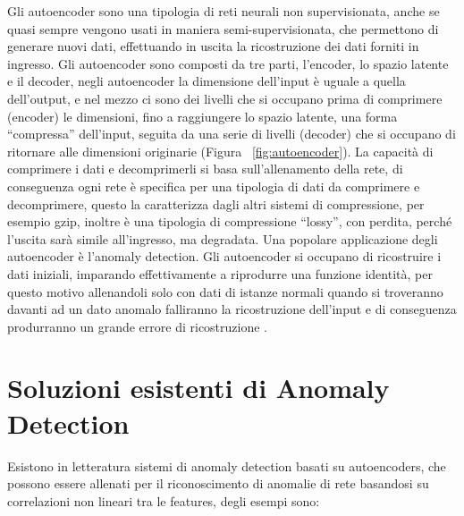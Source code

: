 

Gli autoencoder sono una tipologia di reti neurali non supervisionata, anche se quasi sempre vengono usati in maniera semi-supervisionata, che permettono di generare nuovi dati, effettuando in uscita la ricostruzione dei dati forniti in ingresso.
Gli autoencoder sono composti da tre parti, l'encoder, lo spazio latente e il decoder, negli autoencoder la dimensione dell'input è uguale a quella dell'output, e nel mezzo ci sono dei livelli che si occupano prima di comprimere (encoder) le dimensioni, fino a raggiungere lo spazio latente, una forma ``compressa'' dell'input, seguita da una serie di livelli (decoder) che si occupano di ritornare alle dimensioni originarie (Figura ~\ref{fig:autoencoder}).
La capacità di comprimere i dati e decomprimerli si basa sull'allenamento della rete, di conseguenza ogni rete è specifica per una tipologia di dati da comprimere e decomprimere, questo la caratterizza dagli altri sistemi di compressione, per esempio gzip, inoltre è una tipologia di compressione ``lossy'', con perdita, perché l'uscita sarà simile all'ingresso, ma degradata.
Una popolare applicazione degli autoencoder è l'anomaly detection. Gli autoencoder si occupano di ricostruire i dati iniziali, imparando effettivamente a riprodurre una funzione identità, per questo motivo allenandoli solo con dati di istanze normali quando si troveranno davanti ad un dato anomalo falliranno la ricostruzione dell'input e di conseguenza produrranno un grande errore di ricostruzione \cite{anomaly_detection_survey_2_deep_learning}. 


\section{Soluzioni esistenti di Anomaly Detection}

Esistono in letteratura sistemi di anomaly detection basati su autoencoders, che possono essere allenati per il riconoscimento di anomalie di rete basandosi su correlazioni non lineari tra le features, degli esempi sono:

